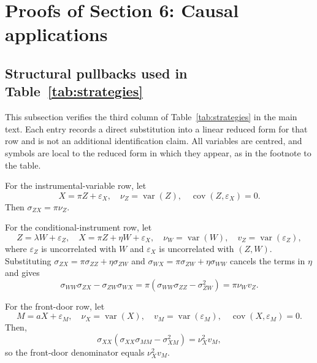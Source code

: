 \documentclass[12pt,a4paper]{article}
\theoremstyle{plain}
\theoremstyle{definition}
\newcommand{\var}{\operatorname{var}}
\newcommand{\cov}{\operatorname{cov}}
\newcommand{\eps}{\varepsilon}
\begin{document}
\section{Proofs of Section 6: Causal applications}
\label{supp:causal-proofs}

\subsection{Structural pullbacks used in Table~\ref{tab:strategies}}
\label{supp:structural-pullbacks}

This subsection verifies the third column of Table~\ref{tab:strategies} in the main text.
Each entry records a direct substitution into a linear reduced form for that row and is not an additional identification claim.
All variables are centred, and symbols are local to the reduced form in which they appear, as in the footnote to the table.

For the instrumental-variable row, let
\begin{equation*}
    X=\pi Z+\eps_X
    ,\quad
    \nu_Z=\var(Z)
    ,\quad
    \cov(Z,\eps_X)=0
    .
\end{equation*}
Then $\sigma_{ZX}=\pi\nu_Z$.

For the conditional-instrument row, let
\begin{equation*}
    Z=\lambda W+\eps_Z
    ,\quad
    X=\pi Z+\eta W+\eps_X
    ,\quad
    \nu_W=\var(W)
    ,\quad
    v_Z=\var(\eps_Z)
    ,
\end{equation*}
where $\eps_Z$ is uncorrelated with $W$ and $\eps_X$ is uncorrelated with $(Z,W)$.
Substituting $\sigma_{ZX}=\pi\sigma_{ZZ}+\eta\sigma_{ZW}$ and $\sigma_{WX}=\pi\sigma_{ZW}+\eta\sigma_{WW}$ cancels the terms in $\eta$ and gives
\begin{equation*}
    \sigma_{WW}\sigma_{ZX}-\sigma_{ZW}\sigma_{WX}
    =
    \pi(\sigma_{WW}\sigma_{ZZ}-\sigma_{ZW}^2)
    =
    \pi\nu_Wv_Z
    .
\end{equation*}

For the front-door row, let
\begin{equation*}
    M=aX+\eps_M
    ,\quad
    \nu_X=\var(X)
    ,\quad
    v_M=\var(\eps_M)
    ,\quad
    \cov(X,\eps_M)=0
    .
\end{equation*}
Then,
\begin{equation*}
    \sigma_{XX}(\sigma_{XX}\sigma_{MM}-\sigma_{XM}^2)
    =
    \nu_X^2v_M
    ,
\end{equation*}
so the front-door denominator equals $\nu_X^2v_M$.
\end{document}
